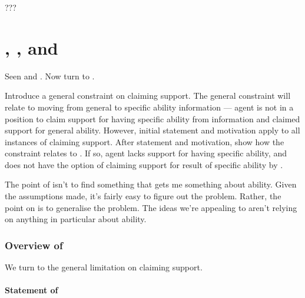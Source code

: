 \begin{note}[Summarising]
  ???
\end{note}

\section{\nI{}, \gsi{}, and }
\label{sec:second-conditional}

\begin{note}
  Seen \ESU{} and \adB{}.
  Now turn to \adA{}.
\end{note}

\begin{note}
  Introduce a general constraint on claiming support.
  The general constraint will relate to moving from general to specific ability information --- agent is not in a position to claim support for having specific ability from information and claimed support for general ability.
  However, initial statement and motivation apply to all instances of claiming support.
  After statement and motivation, show how the constraint relates to \adA{}.
  If so, agent lacks support for having specific ability, and does not have the option of claiming support for result of specific ability by \adA{}.
\end{note}

\begin{note}
  \color{red}
  \large

  The point of \nI{} isn't to find something that gets me something about ability.
  Given the assumptions made, it's fairly easy to figure out the problem.
  Rather, the point on \nI{} is to generalise the problem.
  The ideas we're appealing to aren't relying on anything in particular about ability.
\end{note}

\subsubsection{Overview of \nI{}}
\label{sec:ni-1}

\begin{note}
  We turn to the general limitation on claiming support.
\end{note}

\paragraph{Statement of \nI{}}

